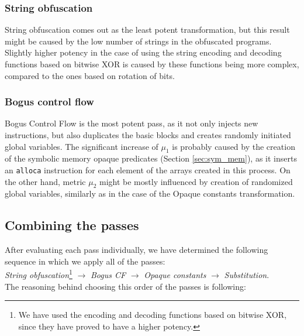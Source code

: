 \documentclass[
  digital, %
  notable,   %
  twoside, %
  nolof,     %
  nolot,     %
]{fithesis3}
\theoremstyle{definition}
\begin{document}
\subsubsection{String obfuscation}
String obfuscation comes out as the least potent transformation, but this result might be caused by the low number of strings in the obfuscated programs. Slightly higher potency in the case of using the string encoding and decoding functions based on bitwise XOR is caused by these functions being more complex, compared to the ones based on rotation of bits. 

\subsubsection{Bogus control flow}
Bogus Control Flow is the most potent pass, as it not only injects new instructions, but also duplicates the basic blocks and creates randomly initiated global variables. The significant increase of $\mu_1$ is probably caused by the creation of the symbolic memory opaque predicates (Section \ref{sec:sym_mem}), as it inserts an \texttt{alloca} instruction for each element of the arrays created in this process. On the other hand, metric $\mu_2$ might be mostly influenced by creation of randomized global variables, similarly as in the case of the Opaque constants transformation. 

\subsection{Combining the passes} \label{sec:combine}

After evaluating each pass individually, we have determined the following sequence in which we apply all of the passes: \\

\textit{String obfuscation}\footnote{We have used the encoding and decoding functions based on bitwise XOR, since they have proved to have a higher potency.} $\rightarrow$ \textit{Bogus CF} $\rightarrow$ \textit{Opaque constants} $\rightarrow$ \textit{Substitution}. \\

The reasoning behind choosing this order of the passes is following: 
\end{document}
